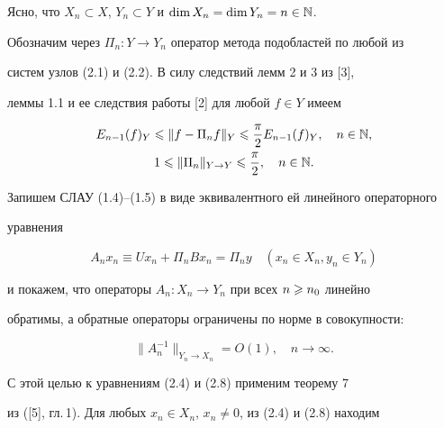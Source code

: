 Ясно, что $X_n\subset X$, $Y_n\subset Y$ и $\dim X_n = \dim Y_n = n\in \Bbb{N}$.





Обозначим через $\Pi_n:Y\to Y_n$ оператор метода подобластей по любой из 


систем узлов (2.1) и (2.2). В силу следствий лемм 2 и 3 из [3], 


леммы 1.1 и ее следствия работы [2] для любой $f\in Y$ имеем


\begin{gather}


E_{n-1}(f)_Y\lea\|f-\Pi_n f\|_Y\lea\frac{\pi}{2}E_{n-1}(f)_Y,\quad n\in\N,\\


%


1\lea \|\Pi_n\|_{Y\to Y}\lea \frac{\pi}{2},\quad n\in\N.


\end{gather}





Запишем СЛАУ (1.4)--(1.5) в виде эквивалентного ей линейного операторного 


уравнения


\begin{equation}


A_n x_n\equiv Ux_n + \Pi_n B x_n = \Pi_n y \quad (x_n\in X_n, y_n\in Y_n)


\end{equation}


и покажем, что операторы $A_n:X_n\to Y_n$ при всех $n\geqslant n_0$ линейно 


обратимы, а обратные операторы ограничены по норме в совокупности:


\begin{equation}


\|A_n^{-1}\|_{Y_n\to X_n} = O(1),\quad n\to \infty.


\end{equation}


С этой целью к уравнениям (2.4) и (2.8) применим теорему 7 


из ([5], гл.\,1). Для любых $x_n\in X_n$, $x_n \ne 0$, из (2.4) и (2.8) находим


